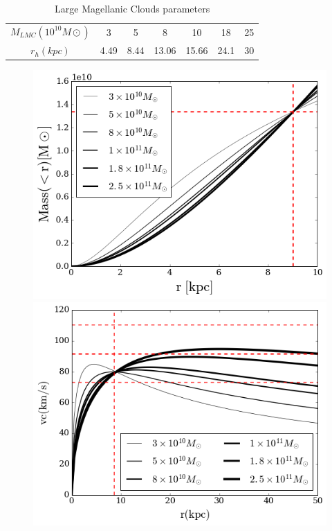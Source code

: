 \begin{table}[H]{\label{tab:LMC}}
\begin{center}
\begin{tabular}{c c c c c c c}
\hline
\hline
$M_{LMC} (10^10M\odot)$ & 3 & 5 & 8 & 10 & 18 & 25 \\
$r_h(kpc)$ & 4.49 & 8.44 & 13.06 & 15.66 & 24.1 & 30 \\
\hline
\end{tabular}
\end{center}
\caption{Large Magellanic Clouds parameters \label{tab:LMC}}
\end{table}

\begin{figure}[H]
\centering
\includegraphics[scale=0.4]{LMC_mass_hernquist.png}
\includegraphics[scale=0.4]{LMC_rotcurve_hernquist.png}
\caption{\label{fig:LMC_mass}}
\end{figure}

